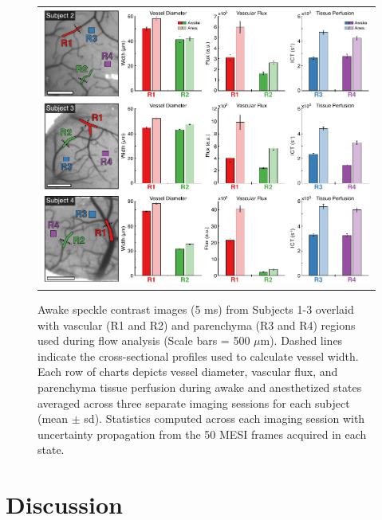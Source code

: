 \documentclass[12pt]{spieman}
\begin{document}
\begin{spacing}{2}
\begin{figure}
    \begin{center}
        \begin{tabular}{c}
            \includegraphics[width=6.25in]{Figure3.pdf}
        \end{tabular}
    \end{center}
    \caption {
        \label{fig:summary}
        Awake speckle contrast images (5 ms) from Subjects 1-3 overlaid with vascular (R1 and R2) and parenchyma (R3 and R4) regions used during flow analysis (Scale bars = 500 $\mu$m). Dashed lines indicate the cross-sectional profiles used to calculate vessel width. Each row of charts depicts vessel diameter, vascular flux, and parenchyma tissue perfusion during awake and anesthetized states averaged across three separate imaging sessions for each subject (mean $\pm$ sd). Statistics computed across each imaging session with uncertainty propagation from the 50 MESI frames acquired in each state.
    }
\end{figure}


\section{Discussion}
\label{sect:discussion}


\end{spacing}
\end{document}
